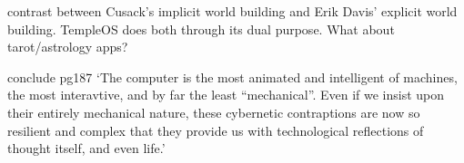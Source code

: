 contrast between Cusack's implicit world building and
Erik Davis' explicit world building.
TempleOS does both through its dual purpose.
What about tarot/astrology apps?

conclude pg187
`The computer is the most animated and intelligent of machines, the most
interavtive, and by far the least ``mechanical''.
Even if we insist upon their entirely mechanical nature, these cybernetic
contraptions are now so resilient and complex that they provide us with
technological reflections of thought itself, and even life.'






\clearpage
\printbibliography

